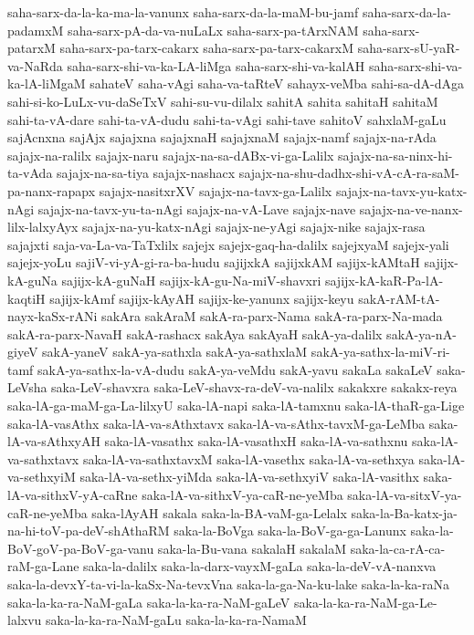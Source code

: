 {saha-sarx-da-la-ka-ma-la-vanunx
saha-sarx-da-la-maM-bu-jamf
saha-sarx-da-la-padamxM
saha-sarx-pA-da-va-nuLaLx
saha-sarx-pa-tArxNAM
saha-sarx-patarxM
saha-sarx-pa-tarx-cakarx
saha-sarx-pa-tarx-cakarxM
saha-sarx-sU-yaR-va-NaRda
saha-sarx-shi-va-ka-LA-liMga
saha-sarx-shi-va-kalAH
saha-sarx-shi-va-ka-lA-liMgaM
sahateV
saha-vAgi
saha-va-taRteV
sahayx-veMba
sahi-sa-dA-dAga
sahi-si-ko-LuLx-vu-daSeTxV
sahi-su-vu-dilalx
sahitA
sahita
sahitaH
sahitaM
sahi-ta-vA-dare
sahi-ta-vA-dudu
sahi-ta-vAgi
sahi-tave
sahitoV
sahxlaM-gaLu
sajAcnxna
sajAjx
sajajxna
sajajxnaH
sajajxnaM
sajajx-namf
sajajx-na-rAda
sajajx-na-ralilx
sajajx-naru
sajajx-na-sa-dABx-vi-ga-Lalilx
sajajx-na-sa-ninx-hi-ta-vAda
sajajx-na-sa-tiya
sajajx-nashacx
sajajx-na-shu-dadhx-shi-vA-cA-ra-saM-pa-nanx-rapapx
sajajx-nasitxrXV
sajajx-na-tavx-ga-Lalilx
sajajx-na-tavx-yu-katx-nAgi
sajajx-na-tavx-yu-ta-nAgi
sajajx-na-vA-Lave
sajajx-nave
sajajx-na-ve-nanx-lilx-lalxyAyx
sajajx-na-yu-katx-nAgi
sajajx-ne-yAgi
sajajx-nike
sajajx-rasa
sajajxti
saja-va-La-va-TaTxlilx
sajejx
sajejx-gaq-ha-dalilx
sajejxyaM
sajejx-yali
sajejx-yoLu
sajiV-vi-yA-gi-ra-ba-hudu
sajijxkA
sajijxkAM
sajijx-kAMtaH
sajijx-kA-guNa
sajijx-kA-guNaH
sajijx-kA-gu-Na-miV-shavxri
sajijx-kA-kaR-Pa-lA-kaqtiH
sajijx-kAmf
sajijx-kAyAH
sajijx-ke-yanunx
sajijx-keyu
sakA-rAM-tA-nayx-kaSx-rANi
sakAra
sakAraM
sakA-ra-parx-Nama
sakA-ra-parx-Na-mada
sakA-ra-parx-NavaH
sakA-rashacx
sakAya
sakAyaH
sakA-ya-dalilx
sakA-ya-nA-giyeV
sakA-yaneV
sakA-ya-sathxla
sakA-ya-sathxlaM
sakA-ya-sathx-la-miV-ri-tamf
sakA-ya-sathx-la-vA-dudu
sakA-ya-veMdu
sakA-yavu
sakaLa
sakaLeV
saka-LeVsha
saka-LeV-shavxra
saka-LeV-shavx-ra-deV-va-nalilx
sakakxre
sakakx-reya
saka-lA-ga-maM-ga-La-lilxyU
saka-lA-napi
saka-lA-tamxnu
saka-lA-thaR-ga-Lige
saka-lA-vasAthx
saka-lA-va-sAthxtavx
saka-lA-va-sAthx-tavxM-ga-LeMba
saka-lA-va-sAthxyAH
saka-lA-vasathx
saka-lA-vasathxH
saka-lA-va-sathxnu
saka-lA-va-sathxtavx
saka-lA-va-sathxtavxM
saka-lA-vasethx
saka-lA-va-sethxya
saka-lA-va-sethxyiM
saka-lA-va-sethx-yiMda
saka-lA-va-sethxyiV
saka-lA-vasithx
saka-lA-va-sithxV-yA-caRne
saka-lA-va-sithxV-ya-caR-ne-yeMba
saka-lA-va-sitxV-ya-caR-ne-yeMba
saka-lAyAH
sakala
saka-la-BA-vaM-ga-Lelalx
saka-la-Ba-katx-ja-na-hi-toV-pa-deV-shAthaRM
saka-la-BoVga
saka-la-BoV-ga-ga-Lanunx
saka-la-BoV-goV-pa-BoV-ga-vanu
saka-la-Bu-vana
sakalaH
sakalaM
saka-la-ca-rA-ca-raM-ga-Lane
saka-la-dalilx
saka-la-darx-vayxM-gaLa
saka-la-deV-vA-nanxva
saka-la-devxY-ta-vi-la-kaSx-Na-tevxVna
saka-la-ga-Na-ku-lake
saka-la-ka-raNa
saka-la-ka-ra-NaM-gaLa
saka-la-ka-ra-NaM-gaLeV
saka-la-ka-ra-NaM-ga-Le-lalxvu
saka-la-ka-ra-NaM-gaLu
saka-la-ka-ra-NamaM
}
